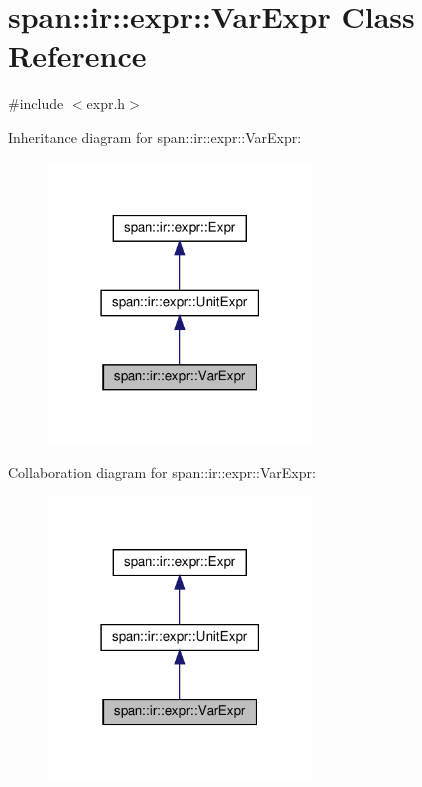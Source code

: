 \hypertarget{classspan_1_1ir_1_1expr_1_1VarExpr}{}\section{span\+:\+:ir\+:\+:expr\+:\+:Var\+Expr Class Reference}
\label{classspan_1_1ir_1_1expr_1_1VarExpr}


{\ttfamily \#include $<$expr.\+h$>$}



Inheritance diagram for span\+:\+:ir\+:\+:expr\+:\+:Var\+Expr\+:\nopagebreak
\begin{figure}[H]
\begin{center}
\leavevmode
\includegraphics[width=198pt]{classspan_1_1ir_1_1expr_1_1VarExpr__inherit__graph}
\end{center}
\end{figure}


Collaboration diagram for span\+:\+:ir\+:\+:expr\+:\+:Var\+Expr\+:\nopagebreak
\begin{figure}[H]
\begin{center}
\leavevmode
\includegraphics[width=198pt]{classspan_1_1ir_1_1expr_1_1VarExpr__coll__graph}
\end{center}
\end{figure}
